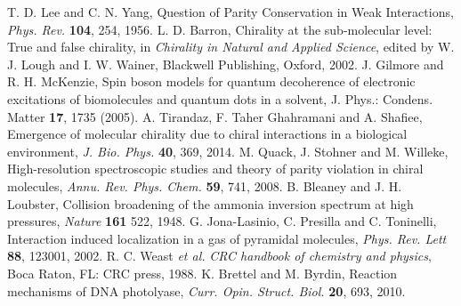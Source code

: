 \documentclass[aps,prl,tightenlines,onecolumn,superscriptaddress]{revtex4}
\begin{document}
\begin{thebibliography}{1}
 T. D. Lee and C. N. Yang, Question of Parity Conservation in Weak Interactions, {\it Phys. Rev.} {\bf 104}, 254, 1956.
 L. D. Barron, Chirality at the sub-molecular level: True and false chirality, in {\it Chirality in Natural and Applied Science}, edited by W. J. Lough and I. W. Wainer, Blackwell Publishing, Oxford, 2002.
 J. Gilmore and R. H. McKenzie, Spin boson models for quantum decoherence of electronic excitations of biomolecules and quantum dots in a solvent, J. Phys.: Condens. Matter {\bf 17}, 1735 (2005).
 A. Tirandaz, F. Taher Ghahramani and A. Shafiee, Emergence of molecular chirality due to chiral interactions in a biological environment, {\it J. Bio. Phys.} {\bf 40}, 369, 2014.
 M. Quack, J. Stohner and M. Willeke, High-resolution spectroscopic studies and theory of parity violation in chiral molecules, {\it Annu. Rev. Phys. Chem.} {\bf 59}, 741, 2008.
 B. Bleaney and J. H. Loubster, Collision broadening of the ammonia inversion spectrum at high pressures, {\it Nature} {\bf 161} 522, 1948.
 G. Jona-Lasinio, C. Presilla and C. Toninelli, Interaction induced localization in a gas of pyramidal molecules, {\it Phys. Rev. Lett} {\bf 88}, 123001, 2002.
 R. C. Weast {\it et al.} {\it CRC handbook of chemistry and physics}, Boca Raton, FL: CRC press, 1988.
 K. Brettel and M. Byrdin, Reaction mechanisms of DNA photolyase, {\it Curr. Opin. Struct. Biol.} {\bf 20}, 693, 2010.
\end{thebibliography}
\end{document}
